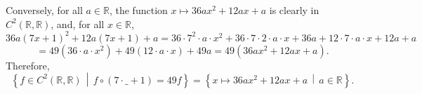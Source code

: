 \begin{solution}
    \\\\
    Conversely, for all \( a \in \mathbb{R} \), the function \( x \mapsto 36ax^2+12ax+a \) is clearly in \( C^2\left(\mathbb{R},\mathbb{R}\right) \), and, for all \( x \in \mathbb{R} \),
    \[
        36a\left(7x+1\right)^2+12a\left(7x+1\right)+a = 36 \cdot 7^2 \cdot a \cdot x^2+36 \cdot 7 \cdot 2 \cdot a \cdot x+36a+12 \cdot 7 \cdot a \cdot x+12a+a
    \]
    \[
        = 49\left(36 \cdot a \cdot x^2\right)+49\left(12 \cdot a \cdot x\right)+49a = 49\left(36ax^2+12ax+a\right).
    \]
    Therefore,
    \[
        \left\{ f \in C^2\left(\mathbb{R},\mathbb{R}\right) \,\middle|\, f \circ \left(7 \cdot \_+1\right) = 49f \right\} = \left\{ x \mapsto 36ax^2+12ax+a \,\middle|\, a \in \mathbb{R} \right\}.
    \]
\end{solution}
